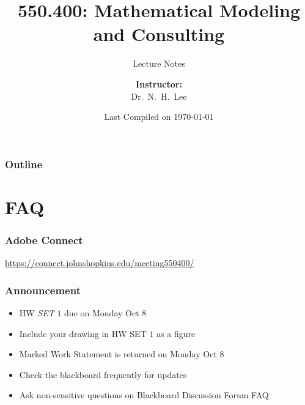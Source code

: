 \documentclass[hyperref={colorlinks=false},handout,10pt]{beamer}
\title{{\color{blue} \LARGE 550.400: Mathematical Modeling and Consulting\newline} }
\subtitle{{\color{red} \large Lecture Notes} }
\author{ 
    {\bf{Instructor:}} \\ 
Dr.~N.~H.~Lee \\ 
    \vspace{5pt}
}
\institute{JHU AMS 2012 FALL}
\date{\mygreen Last Compiled on \today}
\let\olditem\item
\renewcommand{\item}{\setlength{\itemsep}{0.5\baselineskip}\olditem}
\begin{document}
\begin{frame}[plain]
  \titlepage
\end{frame}

\begin{frame}%
  \frametitle{Outline}
  \tableofcontents
\end{frame}

\section{FAQ} 

\begin{frame}
    \frametitle{Adobe Connect}
    \begin{center}
        \Large
        \href{https://connect.johnshopkins.edu/meeting550400/}{https://connect.johnshopkins.edu/meeting550400/}
\end{center}
\end{frame}

\begin{frame}
    \frametitle{Announcement}
    \begin{itemize}
        \item HW \emph{SET} $1$ due on Monday Oct 8
        \item Include your drawing in HW SET $1$ as a figure
        \item Marked Work Statement is returned on Monday Oct 8
        \item Check the blackboard frequently for updates
        \item Ask non-sensitive questions on Blackboard Discussion Forum FAQ
    \end{itemize}
\end{frame}

\end{document}
